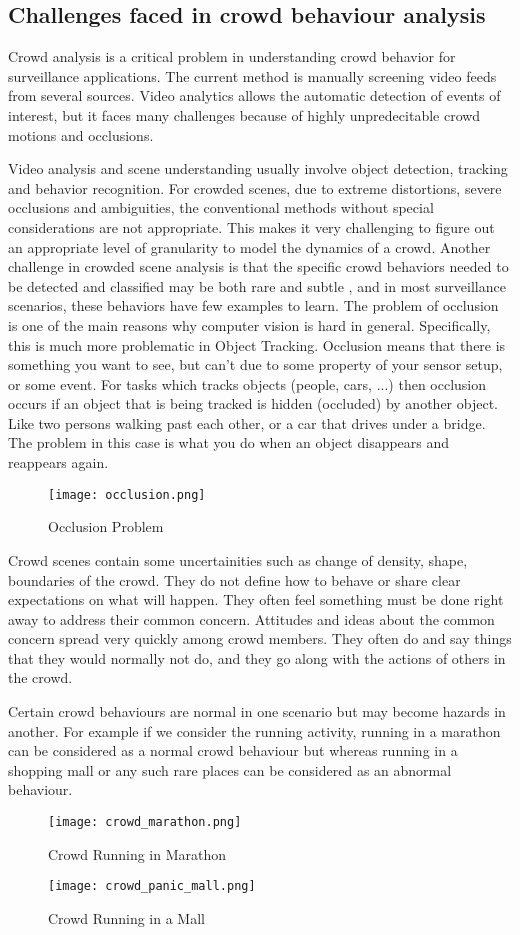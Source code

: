 \subsection{Challenges faced in crowd behaviour analysis}
Crowd analysis is a critical problem in understanding crowd behavior for
surveillance applications. The current method is manually screening video feeds from
several sources. Video analytics allows the automatic detection of events of interest, but
it faces many challenges because of highly unpredecitable crowd motions and occlusions.\par
Video analysis and scene understanding usually involve object detection,
tracking and behavior recognition. For crowded scenes, due to extreme distortions, severe
occlusions and ambiguities, the conventional methods without special considerations are
not appropriate. This makes it very challenging to figure out an appropriate level of granularity
to model the dynamics of a crowd. Another challenge in crowded scene analysis is that
the specific crowd behaviors needed to be detected and classified may be both rare and
subtle , and in most surveillance scenarios, these behaviors have few examples to learn.
The problem of occlusion is one of the main reasons why computer vision is
hard in general. Specifically, this is much more problematic in Object Tracking.
Occlusion means that there is something you want to see, but can't due to some property
of your sensor setup, or some event. For tasks which tracks objects (people, cars, ...)
then occlusion occurs if an object that is being tracked is hidden (occluded) by another
object. Like two persons walking past each other, or a car that drives under a bridge.
The problem in this case is what you do when an object disappears and reappears again.
\begin{figure}[H]
\centering
\texttt{[image: occlusion.png]}
\caption{Occlusion Problem}
\end{figure}
Crowd scenes contain some uncertainities such as change of density, shape,
boundaries of the crowd. They do not define how to behave or share clear expectations
on what will happen. They often feel something must be done right away to address
their common concern. Attitudes and ideas about the common concern spread very
quickly among crowd members. They often do and say things that they would normally
not do, and they go along with the actions of others in the crowd.\par
Certain crowd behaviours are normal in one scenario but may become hazards in
another. For example if we consider the running activity, running in a marathon can be
considered as a normal crowd behaviour but whereas running in a shopping mall or any
such rare places can be considered as an abnormal behaviour.
\begin{figure}[H]
\centering
\texttt{[image: crowd\_marathon.png]}
\caption{Crowd Running in Marathon}
\end{figure}
\begin{figure}[H]
\centering
\texttt{[image: crowd\_panic\_mall.png]}
\caption{Crowd Running in a Mall}
\end{figure}
